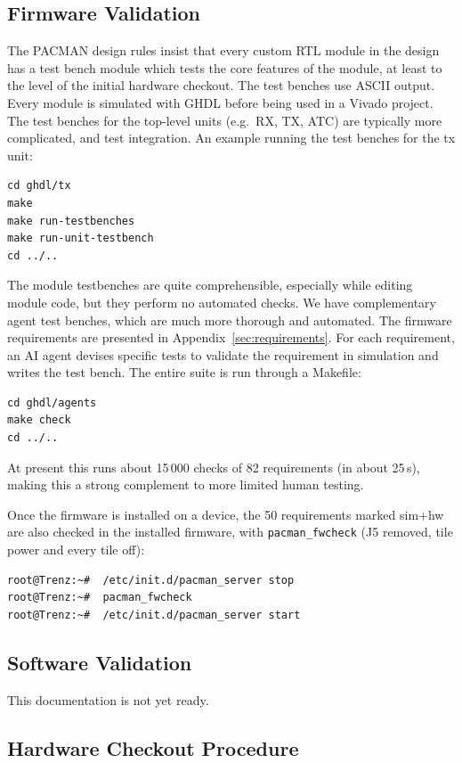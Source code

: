 \documentclass[12pt]{article}
\begin{document}
\subsection{Firmware Validation}

The PACMAN design rules insist that every custom RTL module in the design has a test bench
module which tests the core features of the module, at least to the level of the initial hardware
checkout.  The test benches use ASCII output.  Every module is simulated with GHDL before being used
in a Vivado project.  The test benches for the top-level units (e.g.\ RX, TX, ATC) are typically more
complicated, and test integration.  An example running the test benches for the tx unit:
\begin{lstlisting}[frame=leftline]
cd ghdl/tx
make
make run-testbenches
make run-unit-testbench
cd ../..
\end{lstlisting}
The module testbenches are quite comprehensible, especially while editing module code, but they
perform no automated checks.  We have complementary agent test benches, which are much more thorough
and automated.  The firmware requirements are presented in Appendix~\ref{sec:requirements}.  For each requirement,
an AI agent devises specific tests to validate the requirement in simulation and writes the test
bench.  The entire suite is run through a Makefile:
\begin{lstlisting}[frame=leftline]
cd ghdl/agents
make check
cd ../..
\end{lstlisting}
At present this runs about 15\,000 checks of 82 requirements (in about 25\,s), making this a strong complement
to more limited human testing.

Once the firmware is installed on a device, the 50 requirements marked sim+hw are also checked in the installed
firmware, with \texttt{pacman\_fwcheck} (J5 removed, tile power and every tile off):
\begin{lstlisting}[frame=leftline]
root@Trenz:~#  /etc/init.d/pacman_server stop
root@Trenz:~#  pacman_fwcheck
root@Trenz:~#  /etc/init.d/pacman_server start
\end{lstlisting}


\subsection{Software Validation}

This documentation is not yet ready.

\subsection{Hardware Checkout Procedure}
\end{document}
